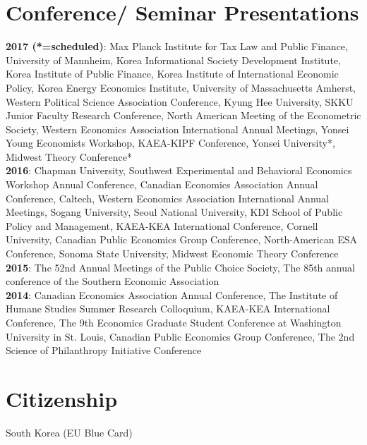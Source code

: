 \documentclass[margin]{res}
\begin{document}
\begin{resume}
\section{Conference/ Seminar Presentations}
\textbf{2017 (*=scheduled)}: Max Planck Institute for Tax Law and Public Finance, University of Mannheim, Korea Informational Society Development Institute, Korea Institute of Public Finance, Korea Institute of International Economic Policy, Korea Energy Economics Institute, University of Massachusetts Amherst, Western Political Science Association Conference, Kyung Hee University, SKKU Junior Faculty Research Conference, North American Meeting of the Econometric Society, Western Economics Association International Annual Meetings, Yonsei Young Economists Workshop, KAEA-KIPF Conference, Yonsei University*, Midwest Theory Conference*\\
\textbf{2016}: Chapman University, Southwest Experimental and Behavioral Economics Workshop Annual Conference, Canadian Economics Association Annual Conference, Caltech, Western Economics Association International Annual Meetings, Sogang University, Seoul National University, KDI School of Public Policy and Management, KAEA-KEA International Conference, Cornell University, Canadian Public Economics Group Conference, North-American ESA Conference, Sonoma State University, Midwest Economic Theory Conference\\
\textbf{2015}: The 52nd Annual Meetings of the Public Choice Society, The 85th annual conference of the Southern Economic Association\\
\textbf{2014}: Canadian Economics Association Annual Conference, The Institute of Humane Studies Summer Research Colloquium, KAEA-KEA International Conference, The 9th Economics Graduate Student Conference at Washington University in St. Louis, Canadian Public Economics Group Conference, The 2nd Science of Philanthropy Initiative Conference


\section{Citizenship} South Korea (EU Blue Card)%


\end{resume}
\end{document}

